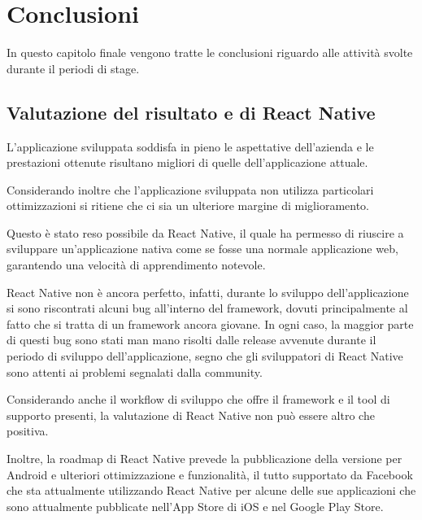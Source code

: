 
\chapter{Conclusioni}
\label{cap:conclusioni}

In questo capitolo finale vengono tratte le conclusioni riguardo alle attività svolte durante il periodi di stage.

\section{Valutazione del risultato e di React Native}

L'applicazione sviluppata soddisfa in pieno le aspettative dell'azienda e le prestazioni ottenute risultano migliori di quelle dell'applicazione attuale.

Considerando inoltre che l'applicazione sviluppata non utilizza particolari ottimizzazioni si ritiene che ci sia un ulteriore margine di miglioramento.

Questo è stato reso possibile da React Native, il quale ha permesso di riuscire a sviluppare un'applicazione nativa come se fosse una normale applicazione web, garantendo una velocità di apprendimento notevole.

React Native non è ancora perfetto, infatti, durante lo sviluppo dell'applicazione si sono riscontrati alcuni bug all'interno del framework, dovuti principalmente al fatto che si tratta di un framework ancora giovane.
In ogni caso, la maggior parte di questi bug sono stati man mano risolti dalle release avvenute durante il periodo di sviluppo dell'applicazione, segno che gli sviluppatori di React Native sono attenti ai problemi segnalati dalla community.

Considerando anche il workflow di sviluppo che offre il framework e il tool di supporto presenti, la valutazione di React Native non può essere altro che positiva.

Inoltre, la roadmap di React Native prevede la pubblicazione della versione per Android e ulteriori ottimizzazione e funzionalità, il tutto supportato da Facebook che sta attualmente utilizzando React Native per alcune delle sue applicazioni che sono attualmente pubblicate nell'App Store di iOS e nel Google Play Store.

